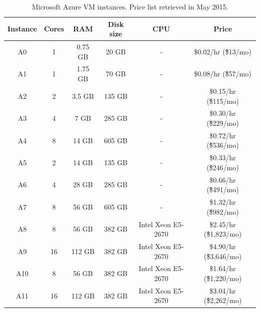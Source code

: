\documentclass[3p,times]{elsarticle}
\begin{document}

	\begin{center}
	\begin{table}
				\begin{tabular}{|c|c|c|c|c|c|}
			\hline
			Instance & Cores & RAM     & Disk size & CPU & Price                    \\ \hline
				A0     & 1     & 0.75 GB & 20 GB      & - & \$0.02/hr (\~\$13/mo)    \\ \hline
				A1     & 1     & 1.75 GB & 70 GB      & - & \$0.08/hr (\~\$57/mo)    \\ \hline
				A2     & 2     & 3.5 GB  & 135 GB     & - & \$0.15/hr (\~\$115/mo)   \\ \hline
				A3     & 4     & 7 GB    & 285 GB     & - & \$0.30/hr (\~\$229/mo)   \\ \hline
				A4     & 8     & 14 GB   & 605 GB     & - & \$0.72/hr (\~\$536/mo)   \\ \hline
				A5     & 2     & 14 GB   & 135 GB     & - & \$0.33/hr (\~\$246/mo)   \\ \hline
				A6     & 4     & 28 GB   & 285 GB     & - & \$0.66/hr (\~\$491/mo)   \\ \hline
				A7     & 8     & 56 GB   & 605 GB     & - & \$1.32/hr (\~\$982/mo)  \\ \hline
				A8     & 8     & 56 GB    & 382 GB    & Intel Xeon E5-2670 & \$2.45/hr (\~\$1,823/mo) \\ \hline
				A9     & 16    & 112 GB  & 382 GB     & Intel Xeon E5-2670 & \$4.90/hr (\~\$3,646/mo) \\ \hline
				A10     & 8     & 56 GB    & 382 GB    & Intel Xeon E5-2670 & \$1.64/hr (\~\$1,220/mo) \\ \hline
				A11     & 16    & 112 GB  & 382 GB     & Intel Xeon E5-2670 & \$3.04/hr (\~\$2,262/mo) \\ \hline
			\end{tabular}
			\label{tab:azureVMs}
			\caption{Microsoft Azure VM instances. Price list retrieved in May 2015.}
	\end{table}
\end{center}
 
\end{document}
